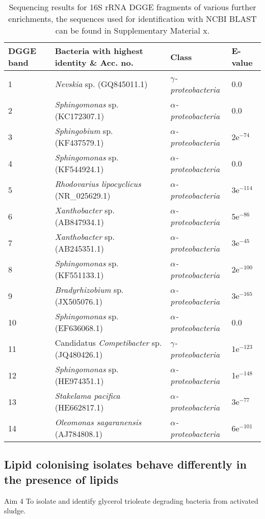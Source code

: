 \documentclass[11pt]{article}
\begin{document}
\begin{table}
\caption{Sequencing results for 16S rRNA DGGE fragments of various further enrichments, the sequences used for identification with NCBI BLAST can be found in Supplementary Material x.}
\begin{tabular}{ | l | p{7.8cm} | p{3cm} | l | }
\hline
DGGE band & Bacteria with highest identity \& Acc. no. & Class & E-value \\
\hline
1 & \emph{Nevskia} sp. (GQ845011.1) & \emph{$\gamma$-proteobacteria} & 0.0  \\
\hline
2 & \emph{Sphingomonas} sp. (KC172307.1) & \emph{$\alpha$-proteobacteria} & 0.0 \\
\hline
3 & \emph{Sphingobium} sp. (KF437579.1) & \emph{$\alpha$-proteobacteria} & 2e$^{-74}$ \\
\hline
4 & \emph{Sphingomonas} sp. (KF544924.1) & \emph{$\alpha$-proteobacteria} & 0.0  \\
\hline
5 & \emph{Rhodovarius lipocyclicus} (NR\_025629.1) & \emph{$\alpha$-proteobacteria} & 3e$^{-114}$ \\
\hline
6 & \emph{Xanthobacter} sp. (AB847934.1) & \emph{$\alpha$-proteobacteria} & 5e$^{-86}$  \\
\hline
7 & \emph{Xanthobacter} sp. (AB245351.1) & \emph{$\alpha$-proteobacteria} & 3e$^{-45}$  \\
\hline
8 & \emph{Sphingomonas} sp.(KF551133.1) & \emph{$\alpha$-proteobacteria} & 2e$^{-100}$  \\
\hline
9 & \emph{Bradyrhizobium} sp. (JX505076.1) & \emph{$\alpha$-proteobacteria} & 3e$^{-165}$  \\
\hline
10 & \emph{Sphingomonas} sp. (EF636068.1) & \emph{$\alpha$-proteobacteria} & 0.0  \\
\hline
11 & Candidatus \emph{Competibacter} sp. (JQ480426.1) & \emph{$\gamma$-proteobacteria} & 1e$^{-123}$  \\
\hline
12 & \emph{Sphingomonas} sp. (HE974351.1) & \emph{$\alpha$-proteobacteria} &  1e$^{-148}$ \\
\hline
13 & \emph{Stakelama pacifica} (HE662817.1) & \emph{$\alpha$-proteobacteria} & 3e$^{-77}$  \\
\hline
14 & \emph{Oleomonas sagaranensis} (AJ784808.1) & \emph{$\alpha$-proteobacteria} & 6e$^{-101}$  \\
\hline
\end{tabular}

\end{table}
\FloatBarrier
\subsection{Lipid colonising isolates behave differently in the presence of lipids}
Aim 4 To isolate and identify glycerol trioleate degrading bacteria from activated sludge.
\end{document}

